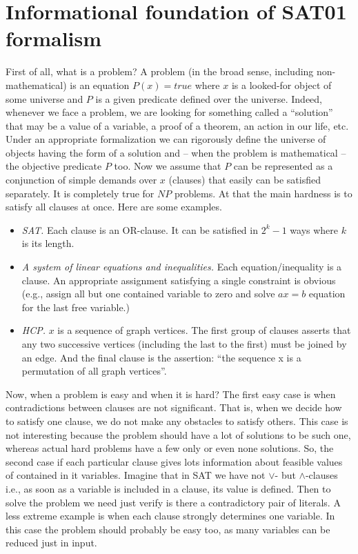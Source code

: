 \documentclass[11pt]{article}
\begin{document}
\section{Informational foundation of SAT01 formalism}
First of all, what is a problem? A problem (in the broad sense, including non-mathematical) is an equation $P(x)=true$ where $x$ is a looked-for object of some universe and $P$ is a given predicate defined over the universe. Indeed, whenever we face a problem, we are looking for something called a ``solution'' that may be a value of a variable, a proof of a theorem, an action in our life, etc. Under an appropriate formalization we can rigorously define the universe of objects having the form of a solution and -- when the problem is mathematical -- the objective predicate $P$ too. Now we assume that $P$ can be represented as a conjunction of simple demands over $x$ (clauses) that easily can be satisfied separately. It is completely true for $NP$ problems. At that the main hardness is to satisfy all clauses at once. Here are some examples.
\begin{itemize}
\item {\em SAT.\/} Each clause is an OR-clause. It can be satisfied in $2^k-1$ ways where $k$ is its length.
\item {\em A system of linear equations and inequalities.\/} Each equation/inequality is a clause. An appropriate assignment satisfying a single constraint is obvious (e.g., assign all but one contained variable to zero and solve $ax=b$ equation for the last free variable.)
\item {\em HCP.\/} $x$ is a sequence of graph vertices. The first group of clauses asserts that any two successive vertices (including the last to the first) must be joined by an edge. And the final clause is the assertion: ``the sequence x is a permutation of all graph vertices''.
\end{itemize}
Now, when a problem is easy and when it is hard? The first easy case is when contradictions between clauses are not significant. That is, when we decide how to satisfy one clause, we do not make any obstacles to satisfy others. This case is not interesting because the problem should have a lot of solutions to be such one, whereas actual hard problems have a few only or even none solutions. So, the second case if each particular clause gives lots information about feasible values of contained in it variables. Imagine that in SAT we have not $\lor$- but $\land$-clauses i.e., as soon as a variable is included in a clause, its value is defined. Then to solve the problem we need just verify is there a contradictory pair of literals. A less extreme example is when each clause strongly determines one variable. In this case the problem should probably be easy too, as many variables can be reduced just in input.
\end{document}
